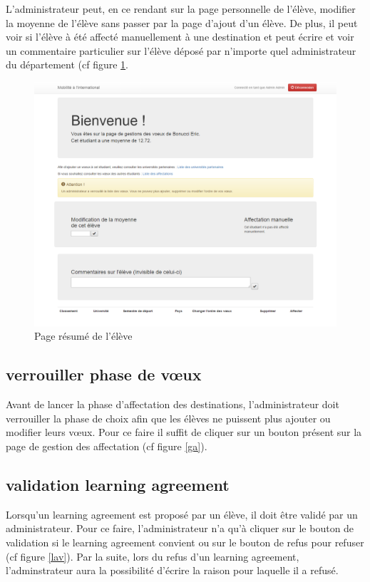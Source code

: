 L'administrateur peut, en ce rendant sur la page personnelle de l'élève, modifier la moyenne de l'élève sans passer par la page d'ajout d'un élève. De plus, il peut voir si l'élève à été affecté manuellement à une destination et peut écrire et voir un commentaire particulier sur l'élève déposé par n'importe quel administrateur du département (cf figure \ref{psa}.

\begin{figure}[H]
	\centering
	\includegraphics[scale=0.3]{images/psa.png}
	\caption{Page résumé de l'élève}
	\label{psa}
\end{figure}

\subsection{verrouiller phase de vœux}

Avant de lancer la phase d'affectation des destinations, l'administrateur doit verrouiller la phase de choix afin que les élèves ne puissent plus ajouter ou modifier leurs vœux. Pour ce faire il suffit de cliquer sur un bouton présent sur la page de gestion des affectation (cf figure \ref{ga}).

\subsection{validation learning agreement}

Lorsqu'un learning agreement est proposé par un élève, il doit être validé par un administrateur. Pour ce faire, l'administrateur n'a qu'à cliquer sur le bouton de validation si le learning agreement convient ou sur le bouton de refus pour refuser (cf figure \ref{lav}).
\smallbreak
Par la suite, lors du refus d'un learning agreement, l'adminstrateur aura la possibilité d'écrire la raison pour laquelle il a refusé.

